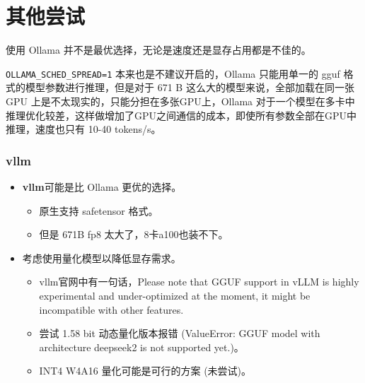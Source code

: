\section{其他尝试}

\begin{frame}
	使用 Ollama 并不是最优选择，无论是速度还是显存占用都是不佳的。
	
	\texttt{OLLAMA\_SCHED\_SPREAD=1} 本来也是不建议开启的，Ollama 只能用单一的 gguf 格式的模型参数进行推理，但是对于 671 B 这么大的模型来说，全部加载在同一张 GPU 上是不太现实的，只能分担在多张GPU上，Ollama 对于一个模型在多卡中推理优化较差，这样做增加了GPU之间通信的成本，即使所有参数全部在GPU中推理，速度也只有 10-40 tokens/s。
\end{frame}

\begin{frame}
\frametitle{vllm}
\begin{itemize}
    \item \textbf{vllm}可能是比 Ollama 更优的选择。
        \begin{itemize}
            \item 原生支持 safetensor 格式。
            \item 但是 671B fp8 太大了，8卡a100也装不下。
        \end{itemize}

        \bigskip
        
    \item 考虑使用量化模型以降低显存需求。
        \begin{itemize}
            \item vllm官网中有一句话，Please note that GGUF support in vLLM is highly experimental and under-optimized at the moment, it might be incompatible with other features.
            \item 尝试 1.58 bit 动态量化版本报错 (ValueError: GGUF model with architecture deepseek2 is not supported yet.)。
            \item INT4 W4A16 量化可能是可行的方案 (未尝试)。
        \end{itemize}
\end{itemize}
\end{frame}

